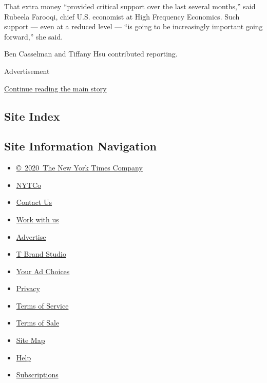 That extra money ``provided critical support over the last several
months,'' said Rubeela Farooqi, chief U.S. economist at High Frequency
Economics. Such support --- even at a reduced level --- ``is going to be
increasingly important going forward,'' she said.

Ben Casselman and Tiffany Hsu contributed reporting.

Advertisement

\protect\hyperlink{after-bottom}{Continue reading the main story}

\hypertarget{site-index}{%
\subsection{Site Index}\label{site-index}}

\hypertarget{site-information-navigation}{%
\subsection{Site Information
Navigation}\label{site-information-navigation}}

\begin{itemize}
\tightlist
\item
  \href{https://help.nytimes3xbfgragh.onion/hc/en-us/articles/115014792127-Copyright-notice}{©~2020~The
  New York Times Company}
\end{itemize}

\begin{itemize}
\tightlist
\item
  \href{https://www.nytco.com/}{NYTCo}
\item
  \href{https://help.nytimes3xbfgragh.onion/hc/en-us/articles/115015385887-Contact-Us}{Contact
  Us}
\item
  \href{https://www.nytco.com/careers/}{Work with us}
\item
  \href{https://nytmediakit.com/}{Advertise}
\item
  \href{http://www.tbrandstudio.com/}{T Brand Studio}
\item
  \href{https://www.nytimes3xbfgragh.onion/privacy/cookie-policy\#how-do-i-manage-trackers}{Your
  Ad Choices}
\item
  \href{https://www.nytimes3xbfgragh.onion/privacy}{Privacy}
\item
  \href{https://help.nytimes3xbfgragh.onion/hc/en-us/articles/115014893428-Terms-of-service}{Terms
  of Service}
\item
  \href{https://help.nytimes3xbfgragh.onion/hc/en-us/articles/115014893968-Terms-of-sale}{Terms
  of Sale}
\item
  \href{https://spiderbites.nytimes3xbfgragh.onion}{Site Map}
\item
  \href{https://help.nytimes3xbfgragh.onion/hc/en-us}{Help}
\item
  \href{https://www.nytimes3xbfgragh.onion/subscription?campaignId=37WXW}{Subscriptions}
\end{itemize}

